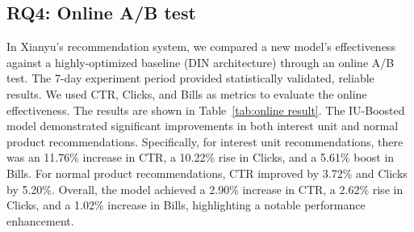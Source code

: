 \subsection{RQ4: Online A/B test}
In Xianyu's recommendation system, we compared a new model's effectiveness against a highly-optimized baseline (DIN architecture) through an online A/B test.
The 7-day experiment period provided statistically validated, reliable results. We used CTR, Clicks, and Bills  as metrics to evaluate the online effectiveness.
The results are shown in Table~\ref{tab:online result}.
The IU-Boosted model demonstrated significant improvements in both interest unit and normal product recommendations. Specifically, for interest unit recommendations, there was an 11.76\% increase in CTR, a 10.22\% rise in Clicks, and a 5.61\% boost in Bills. For normal product recommendations, CTR improved by 3.72\% and Clicks by 5.20\%. Overall, the model achieved a 2.90\% increase in CTR, a 2.62\% rise in Clicks, and a 1.02\% increase in Bills, highlighting a notable performance enhancement.

